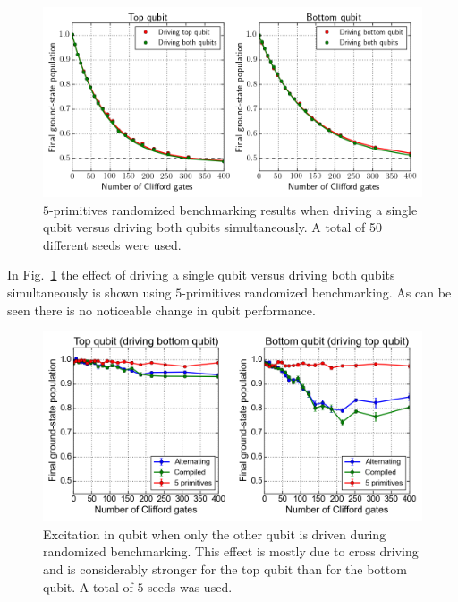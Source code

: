           \begin{figure}[tb]
            \centering
            \includegraphics[width=\textwidth]{Figures/Randomized benchmarking/RB_5p_driving_single_both.png}
            \caption{$5$-primitives randomized benchmarking results when driving a single qubit versus driving both qubits simultaneously. A total of 50 different seeds were used.}
            \label{fig:RB 5P single vs both}
          \end{figure}

          In Fig.~\ref{fig:RB 5P single vs both} the effect of driving a single qubit versus driving both qubits simultaneously is shown using $5$-primitives randomized benchmarking. As can be seen there is no noticeable change in qubit performance.

          \begin{figure}[tb]
            \centering
            \includegraphics[width=\textwidth]{Figures/Randomized benchmarking/RB_2Q_driving_single_vs_both.png}
            \caption{Excitation in qubit when only the other qubit is driven during randomized benchmarking. This effect is mostly due to cross driving and is considerably stronger for the top qubit than for the bottom qubit. A total of $5$ seeds was used.}
            \label{fig:cross driving two qubit randomized benchmarking}
          \end{figure}


